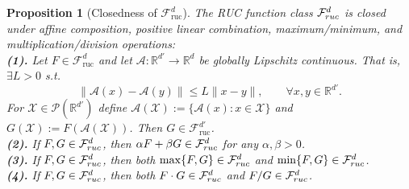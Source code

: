 \documentclass[10pt,a4paper]{amsart}
\newtheorem{proposition}{Proposition}
\newcommand{\cF}{\mathcal{F}}
\newcommand{\cP}{\mathcal{P}}
\newcommand{\cX}{\mathcal{X}}
\begin{document}
\begin{proposition}[Closedness of $\cF_{\text{ruc}}^d$]
\label{proposition:closed}
The RUC function class $\cF_{\emph{ruc}}^d$ is closed under affine composition, positive linear combination, maximum/minimum, and multiplication/division operations:\vspace{0.1cm} \\
\textbf{\emph{(1).}}
Let $F \in \cF_{\mathrm{ruc}}^d$ and let 
$\mathcal{A}:\mathbb{R}^{d'} \to \mathbb{R}^d$ be globally Lipschitz continuous. That is,   $\exists L>0$ s.t.
\[
    \|\mathcal{A}(x) - \mathcal{A}(y)\|
    \le L \|x-y\|,
    \qquad \forall x,y \in \mathbb{R}^{d'}.
\]
For $\cX \in \cP(\mathbb{R}^{d'})$ define 
$\mathcal{A}(\cX) := \{\mathcal{A}(x): x\in\cX\}$ and
$G(\cX) := F(\mathcal{A}(\cX))$.
Then $G \in \cF_{\mathrm{ruc}}^{d'}$.\\
\textbf{\emph{(2)}.}  If $F,G\in\cF_{\emph{ruc}}^{d}$, then $\alpha F+\beta G\in\cF_{\emph{ruc}}^{d}$ for any $\alpha,\beta>0$.\vspace{0.1cm}\\
\textbf{\emph{(3)}.} If $F,G\in\cF_{\emph{ruc}}^{d}$, then both $ \max\{F,G\}\in\cF_{\emph{ruc}}^{d}$ and $\min\{F,G\}\in\cF_{\emph{ruc}}^{d}$.\vspace{0.1cm}\\
\textbf{\emph{(4)}.} If  $F,G\in\cF_{\emph{ruc}}^{d}$, then both $F\cdot G\in\cF_{\emph{ruc}}^{d}$ and $F/G\in\cF_{\emph{ruc}}^{d}$.
\end{proposition}
\end{document}
